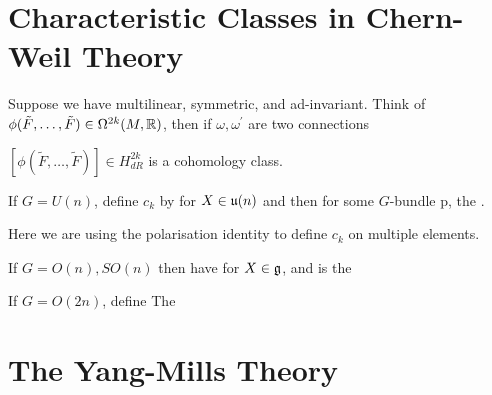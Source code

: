 \documentclass{article}
\begin{document}
\section{Characteristic Classes in Chern-Weil Theory}

\begin{lemma}
Suppose we have 
multilinear, symmetric, and ad-invariant. Think of $\phi(\tilde{F}, \dots, \tilde{F}) \in \Omega^{2k}(M,\mathbb{R})$, then if $\omega, \omega^\prime$ are two connections
\end{lemma}

\begin{corollary}
	$[\phi(\tilde{F}, \dots, \tilde{F})]\in H^{2k}_{dR}$ is a cohomology class. 
\end{corollary}

\begin{example}
	If $G=U(n)$, define $c_k$ by 
for $X \in \mathfrak{u}(n)$ and then 
for some $G$-bundle p, the . 
\end{example}

\begin{remark}
	Here we are using the polarisation identity to define $c_k$ on multiple elements. 
\end{remark}

\begin{example}
	If $G= O(n), SO(n)$ then have 
for $X \in \mathfrak{g}$, and 
is the 
\end{example}

\begin{example}
	If $G=O(2n)$, define 
The  
\end{example}
\section{The Yang-Mills Theory}
\end{document}
